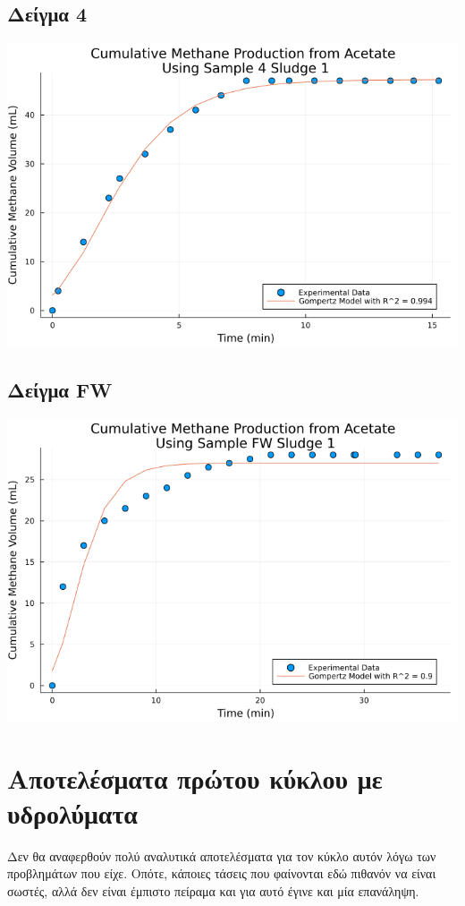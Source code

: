 \documentclass[11pt]{article}
\begin{document}
\subsection{Δείγμα 4}
\label{sec:org97968dc}
\begin{center}
\includegraphics[width=.9\linewidth]{../plots/BMPs/Acetate/methane_kinetics_acet_test_4_s1_min.png}
\end{center}

\subsection{Δείγμα FW}
\label{sec:org2a3888b}
\begin{center}
\includegraphics[width=.9\linewidth]{../plots/BMPs/Acetate/methane_kinetics_acet_test_fw_s1_min.png}
\end{center}

\section{Αποτελέσματα πρώτου κύκλου με υδρολύματα}
\label{sec:orgd7eebe9}
Δεν θα αναφερθούν πολύ αναλυτικά αποτελέσματα για τον κύκλο αυτόν λόγω των προβλημάτων που είχε. Οπότε, κάποιες τάσεις που φαίνονται εδώ πιθανόν να είναι σωστές, αλλά δεν είναι έμπιστο πείραμα και για αυτό έγινε και μία επανάληψη.
\end{document}
